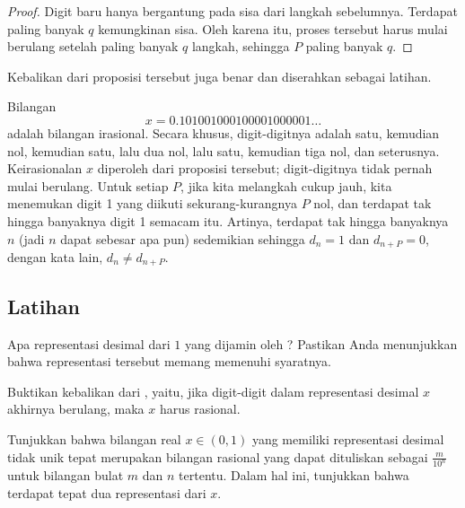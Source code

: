 \begin{proof}
Digit baru hanya bergantung pada sisa dari langkah
sebelumnya.
Terdapat paling banyak $q$ kemungkinan sisa.
Oleh karena itu, proses tersebut harus mulai berulang setelah paling banyak $q$ langkah,
sehingga $P$ paling banyak $q$.
\end{proof}

Kebalikan dari proposisi tersebut juga benar dan diserahkan sebagai latihan.

\begin{example}
Bilangan
\begin{equation*}
x = 0.101001000100001000001\ldots
\end{equation*}
adalah bilangan irasional.
Secara khusus, digit-digitnya adalah satu,
kemudian nol, kemudian satu, lalu dua nol, lalu satu,
kemudian tiga nol,
dan seterusnya.
Keirasionalan $x$ diperoleh dari
proposisi tersebut; digit-digitnya tidak pernah mulai berulang.
Untuk setiap $P$,
jika kita melangkah cukup jauh, kita menemukan digit 1 yang diikuti sekurang-kurangnya $P$ nol,
dan terdapat tak hingga banyaknya digit 1 semacam itu.
Artinya, terdapat tak hingga banyaknya $n$ (jadi $n$ dapat sebesar apa pun)
sedemikian sehingga $d_n=1$ dan $d_{n+P}=0$, dengan kata lain,
$d_n \neq d_{n+P}$.
\end{example}

\subsection{Latihan}

\begin{exercise}[Mudah]
Apa representasi desimal dari $1$ yang dijamin oleh
?  Pastikan Anda menunjukkan bahwa representasi tersebut memang memenuhi
syaratnya.
\end{exercise}

\begin{exercise}
Buktikan kebalikan dari , yaitu,
jika digit-digit dalam representasi desimal $x$ akhirnya berulang, maka
$x$ harus rasional.
\end{exercise}

\begin{exercise} \label{exercise:nonuniquedecimals}
Tunjukkan bahwa bilangan real $x \in (0,1)$ yang memiliki representasi desimal tidak unik
tepat merupakan bilangan rasional yang dapat dituliskan
sebagai $\frac{m}{10^n}$ untuk bilangan bulat $m$ dan $n$ tertentu.  Dalam hal ini, tunjukkan bahwa
terdapat tepat dua representasi dari $x$.
\end{exercise}


